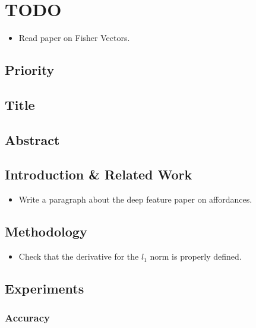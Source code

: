 \section{TODO}\label{todo}

\begin{itemize}
\tightlist
\item
  Read paper on Fisher Vectors.
\end{itemize}

\subsection{Priority}\label{priority}

\subsection{Title}\label{title}

\subsection{Abstract}\label{abstract}

\subsection{Introduction \& Related
Work}\label{introduction-related-work}

\begin{itemize}
\tightlist
\item
  Write a paragraph about the deep feature paper on affordances.
\end{itemize}

\subsection{Methodology}\label{methodology}

\begin{itemize}
\tightlist
\item
  Check that the derivative for the \(l_1\) norm is properly defined.
\end{itemize}

\subsection{Experiments}\label{experiments}

\subsubsection{Accuracy}\label{accuracy}

